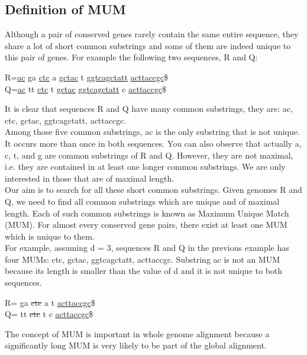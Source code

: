 \documentclass[3p,times]{elsarticle}
\begin{document}
\subsection{Definition of MUM}
Although a pair of conserved genes rarely contain the same entire sequence, they share a lot of short common substrings and some of them are indeed unique to this pair of genes. For example the following two sequences, R and Q:\\
\begin{center}
    R=\underline{ac} ga \underline{ctc} a \underline{gctac} t \underline{ggtcagctatt} \underline{acttaccgc}\$\\
    Q=\underline{ac} tt \underline{ctc} t \underline{gctac} \underline{ggtcagctatt} c \underline{acttaccgc}\$\\
\end{center}
    It is clear that sequences R and Q have many common substrings, they are: ac, ctc, gctac, ggtcagctatt, acttaccgc.\\
Among those five common substrings, ac is the only substring that is not unique. It occurs more than once in both sequences. You can also observe that actually a, c, t, and g are common substrings of R and Q. However, they are not maximal, i.e. they are contained in at least one longer common substrings. We are only interested in those that are of maximal length.\\
Our aim is to search for all these short common substrings. Given genomes R and Q, we need to find all common substrings which are unique and of maximal length. Each of such common substrings is known as Maximum Unique Match (MUM). For almost every conserved gene pairs, there exist at least one MUM which is unique to them.\\
For example, assuming d = 3, sequences R and Q in the previous example has four MUMs: ctc, gctac, ggtcagctatt, acttaccgc. Substring ac is not an MUM because its length is smaller than the value of d and it is not unique to both sequences.
\begin{center}
    R= ga \sout{ctc} a  t  \uline{acttaccgc}\$\\
      Q= tt \sout{ctc} t   c \uline{acttaccgc}\$\\
\end{center}
The concept of MUM is important in whole genome alignment because a significantly long MUM is very likely to be part of the global alignment.
\end{document}

